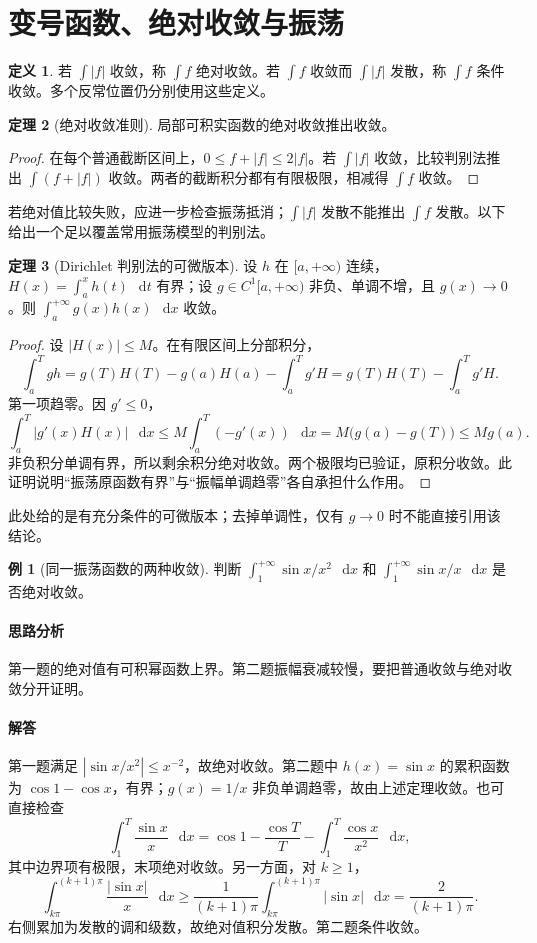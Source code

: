 \documentclass[UTF8,fontset=fandol,12pt,oneside,openany]{ctexrep}
\newcommand{\dd}{\mathop{}\!\mathrm d}
\theoremstyle{definition}
\newtheorem{theorem}{定理}[chapter]
\newtheorem{definition}[theorem]{定义}
\newtheorem{example}{例}[chapter]
\begin{document}
\section{变号函数、绝对收敛与振荡}
\label{lec:13:oscillation}
\begin{definition}
若 $\int|f|$ 收敛，称 $\int f$ 绝对收敛。若 $\int f$ 收敛而 $\int|f|$ 发散，称 $\int f$ 条件收敛。多个反常位置仍分别使用这些定义。
\end{definition}
\begin{theorem}[绝对收敛准则]
局部可积实函数的绝对收敛推出收敛。
\end{theorem}
\begin{proof}
在每个普通截断区间上，$0\le f+|f|\le2|f|$。若 $\int|f|$ 收敛，比较判别法推出 $\int(f+|f|)$ 收敛。两者的截断积分都有有限极限，相减得 $\int f$ 收敛。
\end{proof}
若绝对值比较失败，应进一步检查振荡抵消；$\int|f|$ 发散不能推出 $\int f$ 发散。以下给出一个足以覆盖常用振荡模型的判别法。

\begin{theorem}[Dirichlet 判别法的可微版本]
\label{lec:13:dirichlet}
设 $h$ 在 $[a,+\infty)$ 连续，$H(x)=\int_a^x h(t)\,\dd t$ 有界；设 $g\in C^1[a,+\infty)$ 非负、单调不增，且 $g(x)\to0$。则 $\int_a^{+\infty}g(x)h(x)\,\dd x$ 收敛。
\end{theorem}
\begin{proof}
设 $|H(x)|\le M$。在有限区间上分部积分，
\[
\int_a^T gh=g(T)H(T)-g(a)H(a)-\int_a^T g'H
=g(T)H(T)-\int_a^T g'H.
\]
第一项趋零。因 $g'\le0$，
\[
\int_a^T|g'(x)H(x)|\,\dd x
\le M\int_a^T(-g'(x))\,\dd x
=M\bigl(g(a)-g(T)\bigr)\le Mg(a).
\]
非负积分单调有界，所以剩余积分绝对收敛。两个极限均已验证，原积分收敛。此证明说明“振荡原函数有界”与“振幅单调趋零”各自承担什么作用。
\end{proof}
此处给的是有充分条件的可微版本；去掉单调性，仅有 $g\to0$ 时不能直接引用该结论。

\begin{example}[同一振荡函数的两种收敛]
判断 $\int_1^{+\infty}\sin x/x^2\,\dd x$ 和 $\int_1^{+\infty}\sin x/x\,\dd x$ 是否绝对收敛。
\end{example}
\paragraph{思路分析} 第一题的绝对值有可积幂函数上界。第二题振幅衰减较慢，要把普通收敛与绝对收敛分开证明。
\paragraph{解答} 第一题满足 $|\sin x/x^2|\le x^{-2}$，故绝对收敛。第二题中 $h(x)=\sin x$ 的累积函数为 $\cos1-\cos x$，有界；$g(x)=1/x$ 非负单调趋零，故由上述定理收敛。也可直接检查
\[
\int_1^T\frac{\sin x}{x}\,\dd x
=\cos1-\frac{\cos T}{T}-\int_1^T\frac{\cos x}{x^2}\,\dd x,
\]
其中边界项有极限，末项绝对收敛。另一方面，对 $k\ge1$，
\[
\int_{k\pi}^{(k+1)\pi}\frac{|\sin x|}{x}\,\dd x
\ge\frac1{(k+1)\pi}\int_{k\pi}^{(k+1)\pi}|\sin x|\,\dd x
=\frac2{(k+1)\pi}.
\]
右侧累加为发散的调和级数，故绝对值积分发散。第二题条件收敛。
\end{document}
